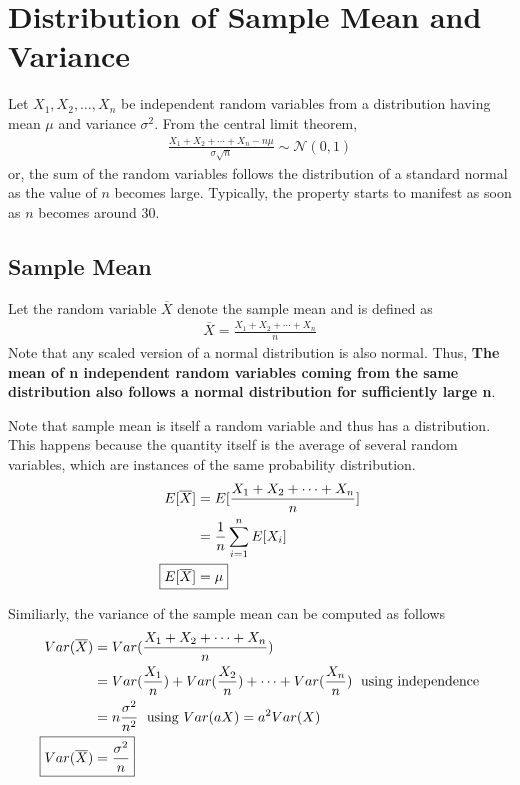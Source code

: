 \documentclass[../probability-notes.tex]{subfiles}
\begin{document}
    \chapter{Distribution of Sample Mean and Variance}
    Let $X_{1}, X_{2}, \ldots, X_{n}$ be independent random variables from a distribution having mean $\mu$ and variance $\sigma^{2}$. From the central limit theorem,
    \begin{align*}
        \frac{X_{1} + X_{2} + \cdots + X_{n} - n\mu}{\sigma \sqrt{n}} \sim \mathcal{N}(0, 1)
    \end{align*}
    or, the sum of the random variables follows the distribution of a standard normal as the value of $n$ becomes large. Typically, the property starts to manifest as soon as $n$ becomes around 30.\newline

    \section{Sample Mean}
    Let the random variable $\overline{X}$ denote the sample mean and is defined as
    \begin{align*}
        \overline{X} = \frac{X_{1} + X_{2} + \cdots + X_{n}}{n}
    \end{align*}
    Note that any scaled version of a normal distribution is also normal. Thus, \textbf{The mean of n independent random variables coming from the same distribution also follows a normal distribution for sufficiently large n}.\newline

    Note that sample mean is itself a random variable and thus has a distribution. This happens because the quantity itself is the average of several random variables, which are instances of the same probability distribution.
    \begin{align}
        E[\overline{X}] &= E[\frac{X_{1} + X_{2} + \cdots + X_{n}}{n}]\\
        &= \frac{1}{n} \sum_{i=1}^{n} E[X_{i}]\\
        \Aboxed{E[\overline{X}] &= \mu}
    \end{align}

    Similiarly, the variance of the sample mean can be computed as follows
    \begin{align*}
        Var(\overline{X}) &= Var(\frac{X_{1} + X_{2} + \cdots + X_{n}}{n})\\
        &= Var(\frac{X_{1}}{n}) + Var(\frac{X_{2}}{n}) + \cdots + Var(\frac{X_{n}}{n}) \text{\; using independence}\\
        &= n \frac{\sigma^{2}}{n^{2}} \text{\; using $Var(aX) = a^{2}Var(X)$}\\
        \Aboxed{Var(\overline{X}) &= \frac{\sigma^{2}}{n}}
    \end{align*}
\end{document}
